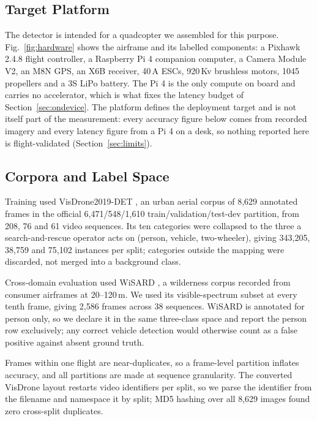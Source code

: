 \documentclass[conference]{IEEEtran}
\begin{document}
\subsection{Target Platform}

The detector is intended for a quadcopter we assembled for this purpose.
Fig.~\ref{fig:hardware} shows the airframe and its labelled components: a
Pixhawk 2.4.8 flight controller, a Raspberry Pi 4 companion computer, a Camera
Module V2, an M8N GPS, an X6B receiver, 40\,A ESCs, 920\,Kv brushless motors,
1045 propellers and a 3S LiPo battery. The Pi 4 is the only compute on board and
carries no accelerator, which is what fixes the latency budget of
Section~\ref{sec:ondevice}. The platform defines the deployment target and is
not itself part of the measurement: every accuracy figure below comes from
recorded imagery and every latency figure from a Pi 4 on a desk, so nothing
reported here is flight-validated (Section~\ref{sec:limits}).

\subsection{Corpora and Label Space}

Training used VisDrone2019-DET \cite{zhu2021}, an urban aerial corpus of 8,629
annotated frames in the official 6,471/548/1,610 train/validation/test-dev
partition, from 208, 76 and 61 video sequences. Its ten categories were
collapsed to the three a search-and-rescue operator acts on (person, vehicle,
two-wheeler), giving 343,205, 38,759 and 75,102 instances per split; categories
outside the mapping were discarded, not merged into a background class.

Cross-domain evaluation used WiSARD \cite{broyles2022}, a wilderness corpus
recorded from consumer airframes at 20--120\,m. We used its visible-spectrum
subset at every tenth frame, giving 2,586 frames across 38 sequences. WiSARD is
annotated for person only, so we declare it in the same three-class space and
report the person row exclusively; any correct vehicle detection would otherwise
count as a false positive against absent ground truth.

Frames within one flight are near-duplicates, so a frame-level partition
inflates accuracy, and all partitions are made at sequence granularity. The
converted VisDrone layout restarts video identifiers per split, so we parse the
identifier from the filename and namespace it by split; MD5 hashing over all
8,629 images found zero cross-split duplicates.
\end{document}
